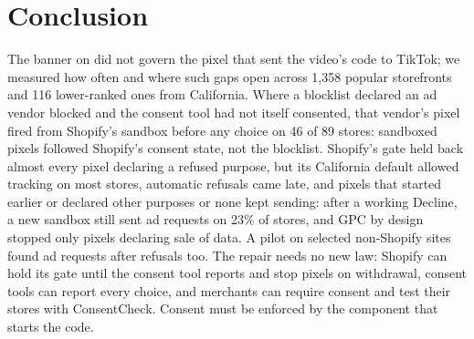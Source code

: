 \section{Conclusion}\label{sec:conclusion}
The banner on \storeC did not govern the pixel that sent the video's code to TikTok; we measured how often and where such gaps open across 1,358 popular storefronts and 116 lower-ranked ones from California. Where a blocklist declared an ad vendor blocked and the consent tool had not itself consented, that vendor's pixel fired from Shopify's sandbox before any choice on 46 of 89 stores: sandboxed pixels followed Shopify's consent state, not the blocklist. Shopify's gate held back almost every pixel declaring a refused purpose, but its California default allowed tracking on most stores, automatic refusals came late, and pixels that started earlier or declared other purposes or none kept sending: after a working Decline, a new sandbox still sent ad requests on 23\% of stores, and GPC by design stopped only pixels declaring sale of data. A pilot on selected non-Shopify sites found ad requests after refusals too. The repair needs no new law: Shopify can hold its gate until the consent tool reports and stop pixels on withdrawal, consent tools can report every choice, and merchants can require consent and test their stores with ConsentCheck. Consent must be enforced by the component that starts the code.
